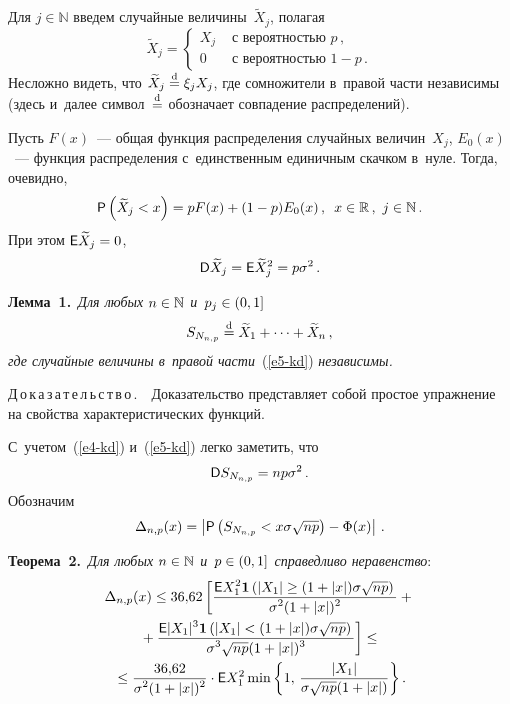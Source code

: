 \begin{multicols}{2}
Для $j\in\mathbb{N}$ введем случайные величины~$\widetilde{X}_j$, полагая
$$
\widetilde{X}_j=
\begin{cases}X_j & \mbox{ с~вероятностью } p\,,\\
0 & \mbox{ с~вероятностью } 1-p\,.
\end{cases}
$$
Несложно видеть, что $\widetilde{X}_j \stackrel{\mathrm{d}}{=} \xi_jX_j$, где сомножители в~правой
части независимы (здесь и~далее символ~$\stackrel{\mathrm{d}}{=}$ обозначает совпадение
распределений).

Пусть $F(x)$~--- общая функция распределения случайных величин~$X_j$,
$E_0(x)$~--- функция распределения с~единственным единичным скачком 
в~нуле. Тогда, очевидно,
$$
{\sf P}\left(\widetilde{X}_j<x\right)=pF(x)+(1-p)E_0(x)\,,\enskip
x\in\mathbb{R}\,,\ j\in\mathbb{N}\,.
$$
При этом ${\sf E}\widetilde{X}_j\hm=0$,
\begin{equation}
{\sf D}\widetilde{X}_j={\sf E}\widetilde{X}_j^2=p\sigma^2\,.
\label{e4-kd}
\end{equation}


\smallskip

\noindent
\textbf{Лемма~1.}\ \textit{Для любых $n\hm\in\mathbb{N}$ и~$p_j\hm\in(0,1]$}
\begin{equation}
S_{N_{n,p}}\stackrel{\mathrm{d}}{=} \widetilde{X}_1+\cdots+\widetilde{X}_n\,,
\label{e5-kd}
\end{equation}
\textit{где случайные величины в~правой части}~(\ref{e5-kd}) \textit{не\-за\-ви\-симы.}

\smallskip

\noindent
Д\,о\,к\,а\,з\,а\,т\,е\,л\,ь\,с\,т\,в\,о\,.\ \
Доказательство представляет собой простое
упражнение на свойства характеристических функций.

\smallskip

С~учетом~(\ref{e4-kd}) и~(\ref{e5-kd}) легко заметить, что
$$
{\sf D}S_{N_{n,p}}=np\sigma^2\,.
$$
Обозначим
$$
\Delta_{n,p}(x)=\left \vert{\sf P}
\left(S_{N_{n,p}}<x\sigma\sqrt{np}\right)-\Phi(x)\right\vert\,.
$$

\smallskip

\noindent
\textbf{Теорема~2.}\ \textit{Для любых $n\hm\in\mathbb{N}$ и~$p\hm\in(0,1]$ справедливо
неравенство}:
\begin{multline*}
\Delta_{n,p}(x)\le 36{,}62\left[\displaystyle\frac{\displaystyle {\sf E}
X_1^2\mathbf{1}\left(|X_1|\ge(1+|x|)\sigma\sqrt{np}\right)\mathstrut}{\displaystyle \sigma^2(1+|x|)^2\mathstrut}+{}\right.
\hspace*{-1.22522pt}\\
\left.{}+
\displaystyle\frac{\displaystyle {\sf E}
|X_1|^3\mathbf{1}\left(|X_1|<(1+|x|)\sigma\sqrt{np}\right)\mathstrut}{\displaystyle \sigma^3\sqrt{np}(1+|x|)^3\mathstrut}
\right]\le{}
\\
{}\le \displaystyle\frac{\displaystyle 36{,}62\mathstrut}{\displaystyle \sigma^2(1+|x|)^2\mathstrut}\cdot {\sf
E}X_1^2\min\left\{ 1,\,\displaystyle\frac{\displaystyle |X_1|\mathstrut}{\displaystyle \sigma\sqrt{np}(1+|x|)\mathstrut}\right\}.
\end{multline*}


\end{multicols}
